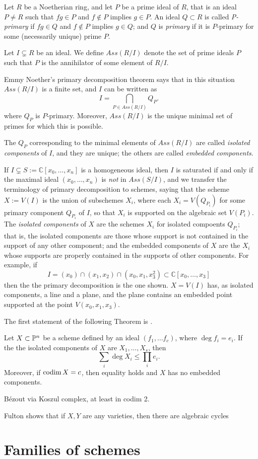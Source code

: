 \documentclass[12pt, leqno]{book}
\def\CC{{\mathbb C}}
\begin{document}

Let $R$ be a Noetherian ring, and let $P$ be a prime ideal of $R$,
that is an ideal $P\neq R$ such that $fg\in P$ and  $f\notin P$ implies $g \in P$.
An ideal $Q\subset R$ is called \emph{P-primary} if $fg\in Q$ and $f\notin P$ implies $g \in Q$;
and $Q$ is \emph{primary} if it is $P$-primary for some (necessarily unique) prime $P$.

Let $I\subsetneq R$ be an ideal. We define $Ass(R/I)$ denote the set of prime ideals $P$ such that $P$ is the annihilator of some element of $R/I$.

Emmy Noether's primary decomposition theorem says that in this situation $Ass(R/I)$ is a finite set, 
and $I$ can be written as  
$$
I = \bigcap_{P\in Ass(R/I)} Q_{P}.
$$
where $Q_{P}$ is $P$-primary. Moreover, $Ass(R/I)$ is the unique minimal set of primes for which this is possible.

The $Q_{P}$ corresponding to the minimal elements of $Ass(R/I)$ are called \emph{isolated components} of
$I$, and they are unique; the others are called \emph{embedded components}. 

If $I \subsetneq S:=\CC[x_{0},\dots,x_{n}]$ is a homogeneous ideal, then $I$ is saturated if and only if
the maximal ideal $(x_{0}, \dots, x_{n})$ is \emph{not} in $Ass(S/I)$, and we transfer the terminology of
primary decomposition to schemes, saying that
the scheme $X := V(I)$ is the union of  subschemes $X_{i}$, where each $X_{i} = V(Q_{P_{i}})$ for some primary
component $Q_{P_{i}}$ of $I$, so that $X_{i}$ is supported on the algebraic
set $V(P_{i})$. The \emph{isolated components} of $X$ are the schemes $X_{i}$ for isolated compoents
$Q_{P_{i}}$; that is, the isolated components are those whose support is not contained in the support of any other
component; and the embedded components of $X$ are the $X_{i}$ whose supports are properly contained in the supports
of other components. For example, if
$$
I = (x_{0})\cap 
(x_{1},x_{2})\cap 
(x_{0},x_{1},x_{3}^{2}) 
\subset \CC[x_{0},\dots,x_{3}]
$$
then the the primary decomposition is the one shown. $X =V(I)$ has, as isolated components, a line and a plane,
and the plane contains an embedded point supported at the point $V(x_{0},x_{1},x_{3})$.

The first statement of the following Theorem is \cite[Exericse 8.4.6]{Fulton}.

\begin{theorem}
Let $X\subset \PP^{n}$ be a scheme defined by an ideal $(f_{1}, \dots f_{c})$, where $\deg f_{i} = e_{i}$.
If the the isolated components of $X$ are $X_{1}, \dots, X_{s}$, then 
$$
\sum_{i} \deg X_{i} \leq \prod_{i} e_{i}.
$$
Moreover, if $\codim X = c$, then equality holds and $X$ has no embedded components.
\end{theorem}

B\'ezout via Koszul complex, at least in codim 2.

\begin{fact}
 Fulton \cite[]{} shows that if $X,Y$ are any varieties, then there are algebraic cycles 
\end{fact}
\section{Families of schemes}
\end{document}
